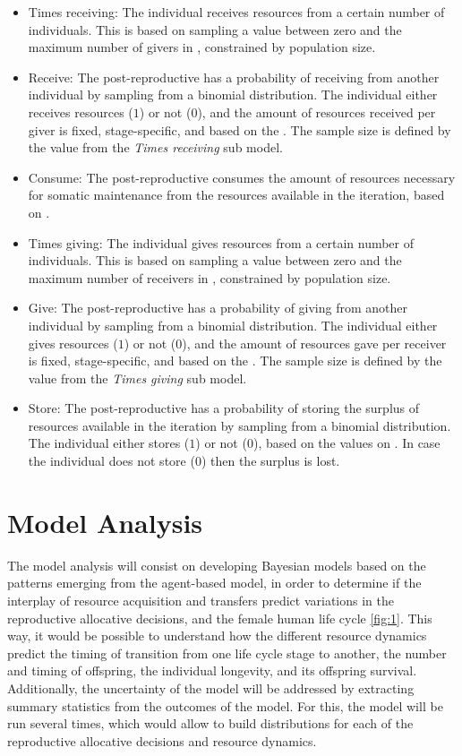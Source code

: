 \documentclass{article}
\begin{document}
\begin{itemize}
\begin{itemize}
        \item Times receiving: The individual receives resources from a certain number of individuals. This is based on sampling a value between zero and the maximum number of givers in \cite{gurven2004give}, constrained by population size.
        \item Receive: The post-reproductive has a probability of receiving from another individual by sampling from a binomial distribution. The individual either receives resources ($1$) or not ($0$), and the amount of resources received per giver is fixed, stage-specific, and based on the \cite{gurven2004give}. The sample size is defined by the value from the \emph{Times receiving} sub model. 
        \item Consume: The post-reproductive consumes the amount of resources necessary for somatic maintenance from the resources available in the iteration, based on \cite{kaplan2000theory,pontzer2021daily}.
        \item Times giving: The individual gives resources from a certain number of individuals. This is based on sampling a value between zero and the maximum number of receivers in \cite{gurven2004give}, constrained by population size.
        \item Give: The post-reproductive has a probability of giving from another individual by sampling from a binomial distribution. The individual either gives resources ($1$) or not ($0$), and the amount of resources gave per receiver is fixed, stage-specific, and based on the \cite{gurven2004give}. The sample size is defined by the value from the \emph{Times giving} sub model. 
        \item Store: The post-reproductive has a probability of storing the surplus of resources available in the iteration by sampling from a binomial distribution. The individual either stores ($1$) or not ($0$), based on the values on \citep{bowles2011cultivation}. In case the individual does not store ($0$) then the surplus is lost.
    \end{itemize}
\end{itemize}

\section{Model Analysis}

The model analysis will consist on developing Bayesian models based on the patterns emerging from the agent-based model, in order to determine if the interplay of resource acquisition and transfers predict variations in the reproductive allocative decisions, and the female human life cycle \ref{fig:1}. This way, it would be possible to understand how the different resource dynamics predict the timing of transition from one life cycle stage to another, the number and timing of offspring, the individual longevity, and its offspring survival. Additionally, the uncertainty of the model will be addressed by extracting summary statistics from the outcomes of the model. For this, the model will be run several times, which would allow to build distributions for each of the reproductive allocative decisions and resource dynamics.
\end{document}
